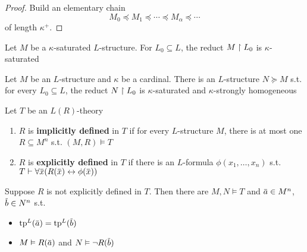 \documentclass[11pt]{article}
\begin{document}
\begin{proof}
Build an elementary chain
\begin{equation*}
M_0\preceq M_1\preceq\cdots\preceq M_\alpha\preceq\cdots
\end{equation*}
of length \(\kappa^+\).
\end{proof}

\begin{lemma}[]
Let \(M\) be a \(\kappa\)-saturated \(L\)-structure. For \(L_0\subseteq L\), the reduct \(M\upharpoonright L_0\) is \(\kappa\)-saturated
\end{lemma}

\begin{lemma}[]
\label{12.3}
Let \(M\) be an \(L\)-structure and \(\kappa\) be a cardinal. There is an \(L\)-structure \(N\succeq M\) s.t.
for every \(L_0\subseteq L\), the reduct \(N\upharpoonright L_0\) is \(\kappa\)-saturated and \(\kappa\)-strongly homogeneous
\end{lemma}

\begin{definition}[]
Let \(T\) be an \(L(R)\)-theory
\begin{enumerate}
\item \(R\) is \textbf{implicitly defined} in \(T\) if for every \(L\)-structure \(M\), there is at most
one \(R\subseteq M^n\) s.t. \((M,R)\vDash T\)
\item \(R\) is \textbf{explicitly defined} in \(T\) if there is an \(L\)-formula \(\phi(x_1,\dots,x_n)\) s.t. \(T\vdash\forall\barx(R(\barx)\leftrightarrow\phi(\barx))\)
\end{enumerate}
\end{definition}

\begin{lemma}[]
Suppose \(R\) is not explicitly defined in \(T\). Then there are \(M,N\vDash T\)
and \(\bara\in M^n\), \(\barb\in N^n\) s.t.
\begin{itemize}
\item \(\tp^L(\bara)=\tp^L(\barb)\)
\item \(M\vDash R(\bara)\) and \(N\vDash\neg R(\barb)\)
\end{itemize}
\end{lemma}
\end{document}

